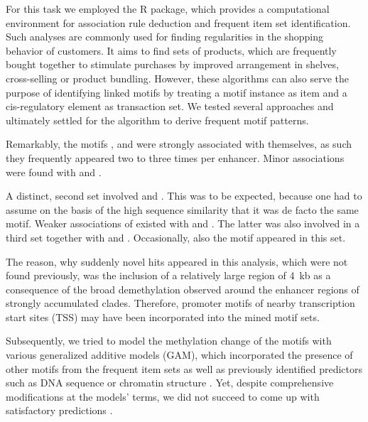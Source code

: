 For this task we employed the  R package\cite{Hahsler2011}, which provides a computational environment for association rule deduction and frequent item set identification. Such analyses are commonly used for finding regularities in the shopping behavior of customers. It aims to find sets of products, which are frequently bought together to stimulate purchases by improved arrangement in shelves, cross-selling or product bundling. However, these algorithms can also serve the purpose of identifying linked motifs by treating a motif instance as item and a cis-regulatory element as transaction set\cite{Ha2012,Navarro2014}. We tested several approaches and ultimately settled for the  algorithm\cite{Agrawal1994a} to derive frequent motif patterns. 

Remarkably, the motifs \motifpolya, \motifmlltwo and \motifmlltwoc were strongly associated with themselves, as such they frequently appeared two to three times per enhancer. Minor associations were found with \motifnkx and \motifrunx. 

A distinct, second set involved \motifx and \motifpuone. This was to be expected, because one had to assume on the basis of the high sequence similarity that it was de facto the same motif. Weaker associations of \motifx existed with \motifetsone and \motifmybb. The latter was also involved in a third set together with \motifblh and \motifxb. Occasionally, also the motif \motifnanog appeared in this set. 

The reason, why suddenly novel hits appeared in this analysis, which were not found previously, was the inclusion of a relatively large region of \SI{4}{\kilo b} as a consequence of the broad demethylation observed around the enhancer regions of strongly accumulated clades. Therefore, promoter motifs of nearby transcription start sites (TSS) may have been incorporated into the mined motif sets. 

Subsequently, we tried to model the methylation change of the motifs with various generalized additive models (GAM), which incorporated the presence of other motifs from the frequent item sets as well as previously identified predictors such as DNA sequence or chromatin structure . Yet, despite comprehensive modifications at the models' terms, we did not succeed to come up with satisfactory predictions \dns. 

